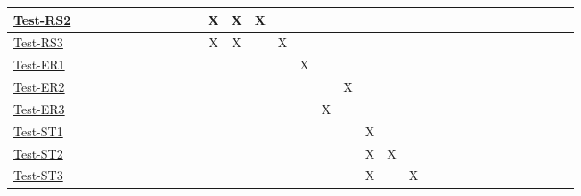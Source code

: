 \documentclass[12pt, titlepage]{article}
\begin{document}
\begin{landscape}
\begin{table}[H]
\begin{adjustwidth}{-0.1in}{-1in}
{\begin{tabular}{c|c|c|c|c|c|c|c|c|c|c|c|c|c|c|c|c|l|l|l|l|l|l|l|l|l|l|l|l|l|l|l|l|}
\multicolumn{1}{|l|}{\hyperref[itm:Test-RS2]{Test-RS2}}   &             &             &             &             &             &             &              &             &              &              &        X     &         X     &      X       &             &              &                & & & & & \\ \hline
\multicolumn{1}{|l|}{\hyperref[itm:Test-RS3]{Test-RS3}}   &             &             &             &              &             &              &             &             &              &              &        X      &       X       &              &     X         &              &                & & & & & \\ \hline
\multicolumn{1}{|l|}{\hyperref[itm:Test-ER1]{Test-ER1}}   &             &             &             &              &             &              &              &             &              &              &             &              &              &             &        X      &                & & & & & \\ \hline
\multicolumn{1}{|l|}{\hyperref[itm:Test-ER2]{Test-ER2}}   &             &             &             &              &             &             &             &             &              &              &              &              &              &              &              &               & X& & & & \\ \hline
\multicolumn{1}{|l|}{\hyperref[itm:Test-ER3]{Test-ER3}}   &              &             &             &              &              &              &              &             &             &             &              &              &             &             &             &         X       & & & & & \\ \hline
\multicolumn{1}{|l|}{\hyperref[itm:Test-ST1]{Test-ST1}}   &             &             &             &              &              &              &              &             &              &              &              &              &              &              &              &             &        &   X  &   & & \\ \hline
\multicolumn{1}{|l|}{\hyperref[itm:Test-ST2]{Test-ST2}}   &              &              &              &              &              &              &              &             &             &             &              &              &              &              &              &             &         &X &X & &\\ \hline
\multicolumn{1}{|l|}{\hyperref[itm:Test-ST3]{Test-ST3}}   &             &              &             &              &              &              &              &             &              &              &              &              &              &              &              &             &      & X& & X&\\ \hline

\end{tabular}}
\end{adjustwidth}
\end{table}
\end{landscape}
\end{document}
